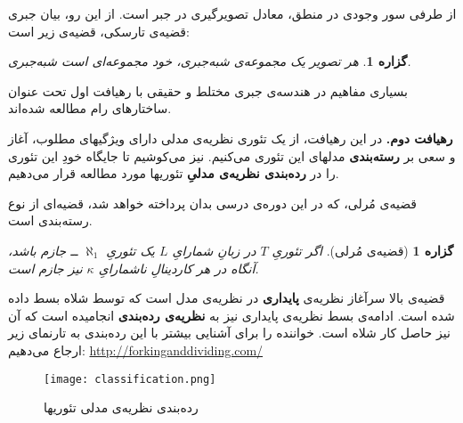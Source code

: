 \documentclass[12pt,a4paper]{report}
\theoremstyle{colorhead}
\newtheorem{prop}[thm]{گزاره}
\begin{document}
از طرفی سور وجودی در منطق، معادل تصویرگیری در جبر است. از این رو، بیان جبری قضیه‌ی تارسکی، قضیه‌ی زیر است:
\begin{prop}
هر تصویر یک مجموعه‌ی شبه‌جبری، خود مجموعه‌ای است شبه‌جبری.
\end{prop}
بسیاری مفاهیم در هندسه‌ی جبری مختلط و حقیقی با رهیافت اول تحت عنوان ساختارهای رام مطالعه شده‌اند. 
\par 
\noindent
\textbf{رهیافت دوم.}
در این رهیافت، از یک تئوری نظریه‌ی مدلی 
دارای 
ویژگیهای مطلوب،
 آغاز و سعی بر 
\textbf{رسته‌بندی }
مدلهای این تئوری می‌کنیم.
نیز می‌کوشیم تا جایگاه خودِ این تئوری را در 
\textbf{رده‌بندی 
نظریه‌ی مدلیِ 
}
تئوریها مورد مطالعه قرار می‌دهیم. 
\par 
قضیه‌ی مُرلی، که در این دوره‌ی درسی بدان پرداخته خواهد شد،
قضیه‌ای از  نوع رسته‌بندی است.
\begin{prop}[قضیه‌ی مُرلی]
اگر تئوریِ
$T$
در زبانِ شمارایِ
$L$
یک تئوریِ
$\aleph_1$ ــ
جازم باشد، آنگاه در هر کاردینالِ 
ناشمارایِ
$\kappa$
نیز جازم است. 
\end{prop}
قضیه‌ی بالا سرآغاز نظریه‌ی 
\textbf{پایداری}
در نظریه‌ی مدل است که توسط شلاه بسط داده شده است. 
ادامه‌ی بسط نظریه‌ی پایداری نیز به 
\textbf{نظریه‌ی رده‌بندی }
انجامیده است که آن نیز حاصل کار شلاه 
است.
خواننده را برای آشنایی بیشتر با این رده‌بندی به تارنمای زیر ارجاع می‌دهیم:
\newline
\url{http://forkinganddividing.com/}
\begin{figure}
\caption{رده‌بندی نظریه‌ی مدلی تئوریها}
\texttt{[image: classification.png]}
\end{figure}
\end{document}

